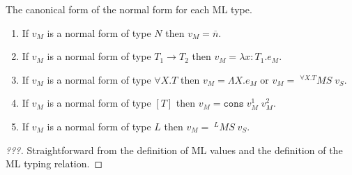 \begin{mcf}
\label{mcf}
The canonical form of the normal form for each ML type.
\begin{enumerate}
\item If $v_{M}$ is a normal form of type $N$ then $v_{M}=\overline{n}$.
\item If $v_{M}$ is a normal form of type $T_{1}\rightarrow T_{2}$ then $v_{M}=\lambda x:T_{1}.e_{M}$.
\item If $v_{M}$ is a normal form of type $\forall X.T$ then $v_{M}=\Lambda X.e_{M}$ or $v_{M}=\;^{\forall X.T}MS\;v_{S}$.
\item If $v_{M}$ is a normal form of type $[T]$ then $v_{M}=\mathtt{cons}\;v_{M}^{1}\;v_{M}^{2}$.
\item If $v_{M}$ is a normal form of type $L$ then $v_{M}=\;^{L}MS\;v_{S}$.
\end{enumerate}
\begin{proof}
[???] Straightforward from the definition of ML values and the definition of the ML typing relation.
\end{proof}
\end{mcf}